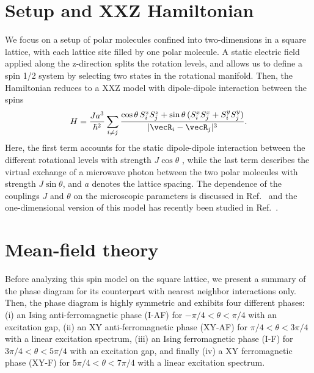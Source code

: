 \section{Setup and XXZ Hamiltonian}
We focus on a setup of polar molecules confined into two-dimensions in a square lattice,
with each lattice site filled by one polar molecule. A static electric field applied along
the z-direction splits the rotation levels, and allows us to define a spin 1/2 system by selecting
two states in the rotational manifold. Then, the Hamiltonian reduces to a XXZ model with dipole-dipole interaction
between the spins \cite{Gorshkov2011}
%
\begin{align}
H = \frac{J a^3}{\hbar^2} \sum_{i \neq j} \frac{\cos \theta \,
S^{z}_{i}S^{z}_{j}+ \sin \theta
\, ( S^{x}_{i} S^{x}_{j} + S^{y}_{i} S^{y}_{j} ) }{|\vecR_{i} - \vecR_{j}|^3}.
\end{align}
%
Here, the first term accounts for the static dipole-dipole
interaction between the different rotational levels with strength $J \cos \theta$ , while the last term
describes the virtual exchange of a microwave photon between the two polar molecules with
strength $J \sin \theta$, and $a$ denotes the lattice spacing.
The dependence of the couplings $J$ and $\theta$ on the microscopic
parameters is discussed in Ref.~\Cite{Muller2010,Gorshkov2011,Gorshkov2011c} and the one-dimensional version of this model has recently been studied in Ref.~\cite{Hauke2010}.

\section{Mean-field theory}

Before analyzing this spin model on the square lattice, we present a
summary of the phase diagram
for its counterpart with nearest neighbor interactions only.
Then, the phase diagram is highly symmetric and
exhibits four different phases: (i) an Ising
anti-ferromagnetic phase (I-AF) for $-\pi/4 < \theta < \pi/4$ with an
excitation gap, (ii) an XY anti-ferromagnetic phase (XY-AF) for $\pi/4 < \theta
< 3\pi/4$ with a linear excitation spectrum, (iii) an Ising ferromagnetic phase
(I-F) for $3 \pi/4 < \theta < 5\pi/4$ with an excitation gap, and finally (iv) a
XY ferromagnetic phase (XY-F) for $5 \pi/4 < \theta < 7\pi/4$ with a linear
excitation spectrum.

